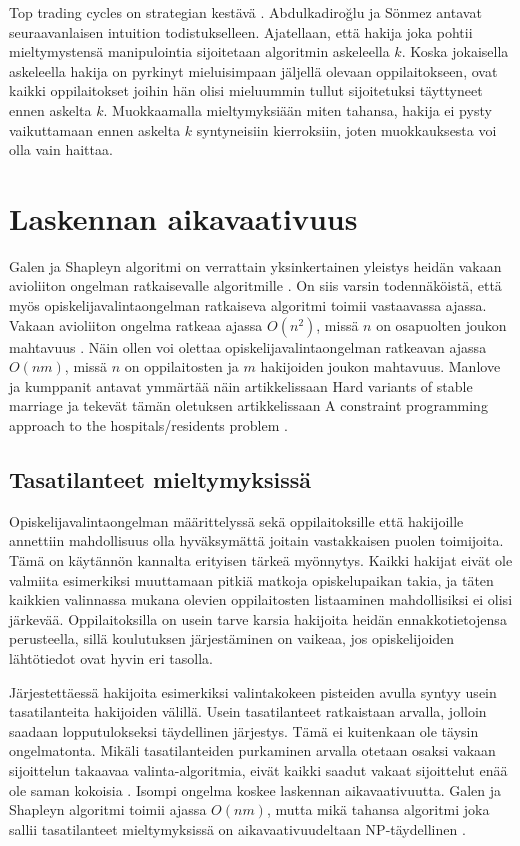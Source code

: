 \documentclass[gradu, twoside]{tktltiki}
\begin{document}
Top trading cycles on strategian kestävä \cite{abdusön03}.
Abdulkadiroğlu ja Sönmez antavat seuraavanlaisen intuition
todistukselleen. Ajatellaan, että hakija joka pohtii mieltymystensä
manipulointia sijoitetaan algoritmin askeleella $k$. Koska jokaisella
askeleella hakija on pyrkinyt mieluisimpaan jäljellä olevaan
oppilaitokseen, ovat kaikki oppilaitokset joihin hän olisi mieluummin
tullut sijoitetuksi täyttyneet ennen askelta $k$. Muokkaamalla
mieltymyksiään miten tahansa, hakija ei pysty vaikuttamaan ennen
askelta $k$ syntyneisiin kierroksiin, joten muokkauksesta voi olla
vain haittaa.

\section{Laskennan aikavaativuus}

Galen ja Shapleyn algoritmi on verrattain yksinkertainen yleistys
heidän vakaan avioliiton ongelman ratkaisevalle algoritmille
\cite{gusfield89}. On siis varsin todennäköistä, että myös
opiskelijavalintaongelman ratkaiseva algoritmi toimii vastaavassa
ajassa. Vakaan avioliiton ongelma ratkeaa ajassa $O(n^2)$, missä $n$
on osapuolten joukon mahtavuus \cite{gusfield89}. Näin ollen voi
olettaa opiskelijavalintaongelman ratkeavan ajassa $O(nm)$, missä $n$
on oppilaitosten ja $m$ hakijoiden joukon mahtavuus. Manlove ja
kumppanit antavat ymmärtää näin artikkelissaan Hard variants of stable
marriage \cite{manlove02} ja tekevät tämän oletuksen artikkelissaan A
constraint programming approach to the hospitals/residents problem
\cite{manlove07}.

\subsection{Tasatilanteet mieltymyksissä}

Opiskelijavalintaongelman määrittelyssä sekä oppilaitoksille että
hakijoille annettiin mahdollisuus olla hyväksymättä joitain
vastakkaisen puolen toimijoita. Tämä on käytännön kannalta erityisen
tärkeä myönnytys. Kaikki hakijat eivät ole valmiita esimerkiksi
muuttamaan pitkiä matkoja opiskelupaikan takia, ja täten kaikkien
valinnassa mukana olevien oppilaitosten listaaminen mahdollisiksi ei
olisi järkevää. Oppilaitoksilla on usein tarve karsia hakijoita heidän
ennakkotietojensa perusteella, sillä koulutuksen järjestäminen on
vaikeaa, jos opiskelijoiden lähtötiedot ovat hyvin eri tasolla.

Järjestettäessä hakijoita esimerkiksi valintakokeen pisteiden avulla
syntyy usein tasatilanteita hakijoiden välillä. Usein tasatilanteet
ratkaistaan arvalla, jolloin saadaan lopputulokseksi täydellinen
järjestys. Tämä ei kuitenkaan ole täysin ongelmatonta. Mikäli
tasatilanteiden purkaminen arvalla otetaan osaksi vakaan sijoittelun
takaavaa valinta-algoritmia, eivät kaikki saadut vakaat sijoittelut
enää ole saman kokoisia \cite{manlove02}. Isompi ongelma koskee
laskennan aikavaativuutta. Galen ja Shapleyn algoritmi toimii ajassa
$O(nm)$, mutta mikä tahansa algoritmi joka sallii tasatilanteet
mieltymyksissä on aikavaativuudeltaan NP-täydellinen \cite{manlove02}.
\end{document}
